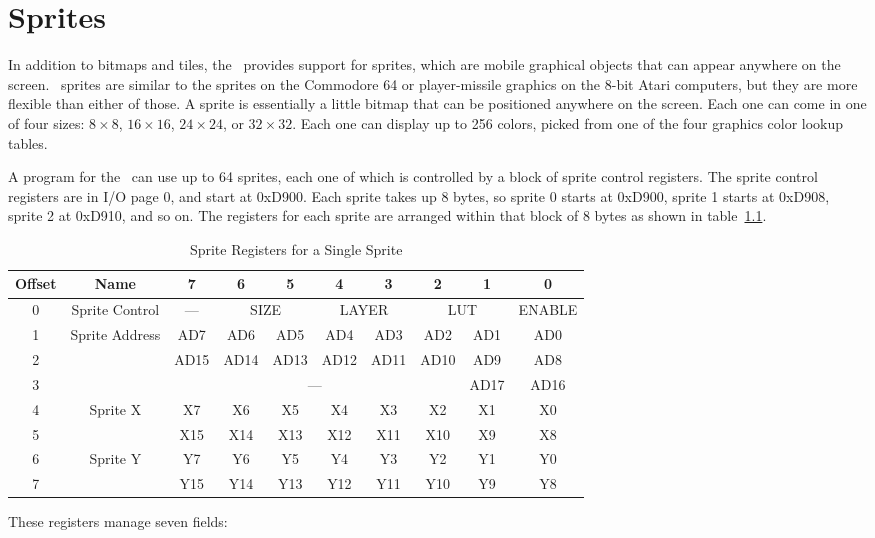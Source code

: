 \chapter{Sprites}

In addition to bitmaps and tiles, the \jr\ provides support for sprites, which are mobile graphical objects that can appear anywhere on the screen. \jr\ sprites are similar to the sprites on the Commodore 64 or player-missile graphics on the 8-bit Atari computers, but they are more flexible than either of those. A sprite is essentially a little bitmap that can be positioned anywhere on the screen. Each one can come in one of four sizes: $8 \times 8$, $16 \times 16$, $24 \times 24$, or $32 \times 32$. Each one can display up to 256 colors, picked from one of the four graphics color lookup tables.

A program for the \jr\ can use up to 64 sprites, each one of which is controlled by a block of sprite control registers. The sprite control registers are in I/O page 0, and start at 0xD900. Each sprite takes up 8 bytes, so sprite 0 starts at 0xD900, sprite 1 starts at 0xD908, sprite 2 at 0xD910, and so on. The registers for each sprite are arranged within that block of 8 bytes as shown in table~\ref{tab:sp_reg}.

\begin{table}[h]
    \begin{center}
        \begin{tabular}{|c|c|c|c|c|c|c|c|c|c|} \hline
            Offset & Name & 7 & 6 & 5 & 4 & 3 & 2 & 1 & 0 \\ \hline\hline
            0 & Sprite Control & --- & \multicolumn{2}{|c|}{SIZE} & \multicolumn{2}{|c|}{LAYER} & \multicolumn{2}{|c|}{LUT} & ENABLE \\ \hline
            1 & \multirow{3}{*}{Sprite Address} & AD7 & AD6 & AD5 & AD4 & AD3 & AD2 & AD1 & AD0 \\ \cline{1-1}\cline{3-10}
            2 &  & AD15 & AD14 & AD13 & AD12 & AD11 & AD10 & AD9 & AD8 \\ \cline{1-1}\cline{3-10}
            3 &  & \multicolumn{6}{|c|}{---} & AD17 & AD16 \\ \hline
            4 & \multirow{2}{*}{Sprite X} & X7 & X6 & X5 & X4 & X3 & X2 & X1 & X0 \\ \cline{1-1}\cline{3-10}
            5 &  & X15 & X14 & X13 & X12 & X11 & X10 & X9 & X8 \\ \hline
            6 & \multirow{2}{*}{Sprite Y} & Y7 & Y6 & Y5 & Y4 & Y3 & Y2 & Y1 & Y0 \\ \cline{1-1}\cline{3-10}
            7 &  & Y15 & Y14 & Y13 & Y12 & Y11 & Y10 & Y9 & Y8 \\ \hline
        \end{tabular}
    \end{center}
    \caption{Sprite Registers for a Single Sprite}
    \label{tab:sp_reg}
\end{table}
These registers manage seven fields:

